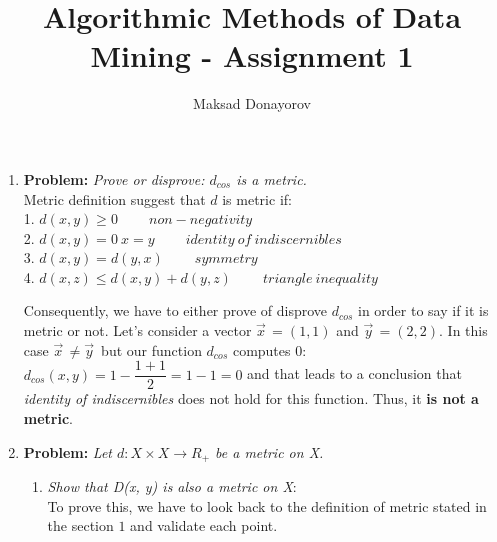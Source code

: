 \documentclass[11pt,a4paper,english]{article}
\title{Algorithmic Methods of Data Mining - Assignment 1}
\author{Maksad Donayorov}
\begin{document}
      \maketitle

      \begin{enumerate}
        \item \textbf{Problem:} \textit{Prove or disprove: $d_{cos}$ is a metric.} \\
            Metric definition suggest that $d$ is metric if:\\
            1. \begin{math}d(x,y) \geq 0\ \qquad non-negativity\end{math}\\
            2. \begin{math}d(x,y) = 0\ x=y\ \qquad identity\ of\ indiscernibles\end{math}\\
            3. \begin{math}d(x,y)=d(y,x)\ \qquad symmetry\end{math}\\
            4. \begin{math}d(x,z)\leq d(x,y)+d(y,z)\ \qquad triangle\ inequality\end{math}

            Consequently, we have to either prove of disprove $d_{cos}$ in order to
            say if it is metric or not. Let's consider a vector $\vec{x}^{\,}=(1,1)$ and
            $\vec{y}^{\,}=(2,2)$. In this case $\vec{x}^{\,} \neq \vec{y}^{\,}$
            but our function $d_{cos}$ computes 0:\\
            \begin{math}d_{cos}(x,y)=1-\dfrac{1+1}{2}=1-1=0\end{math}
            and that leads to a conclusion that \textit{identity of indiscernibles} does
            not hold for this function. Thus, it \textbf{is not a metric}.

        \item \textbf{Problem:} \textit{Let $d:X \times X \rightarrow R_+$ be a metric on X.}
            \begin{enumerate}
                \item \textit{Show that D(x, y) is also a metric on X}:\\
                    To prove this, we have to look back to the definition of metric
                    stated in the section $1$ and validate each point.


\end{enumerate}
\end{enumerate}
\end{document}
